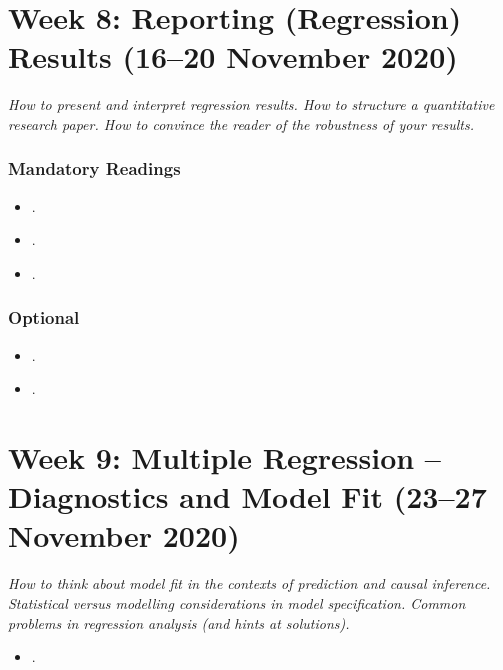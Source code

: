 \documentclass[abstract=on,parskip=full,headings=standardclasses,fontsize=11pt,paper=a4]{scrartcl}
\begin{document}
\section{Week 8: Reporting (Regression) Results (16--20 November 2020)}


\textit{How to present and interpret regression results. How to structure a quantitative research paper. How to convince the reader of the robustness of your results.}


\subsubsection*{Mandatory Readings}
\begin{itemize}
\item {}.
\item {}.
\item {}.
\end{itemize}


\subsubsection*{Optional}
\begin{itemize}
\item {}.
\item {}.
\end{itemize}



\section{Week 9: Multiple Regression --  Diagnostics and Model Fit (23--27 November 2020)}


\textit{How to think about model fit in the contexts of prediction and causal inference. Statistical versus modelling considerations in model specification. Common problems in regression analysis (and hints at solutions).}

\begin{itemize}
\item {}.
\end{itemize}
\end{document}

